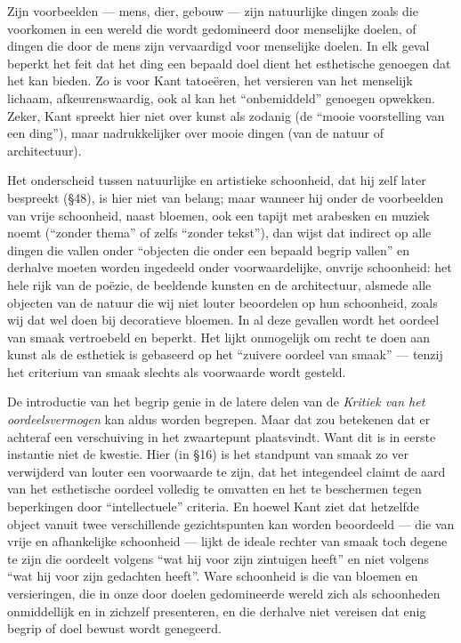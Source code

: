 Zijn voorbeelden — mens, dier, gebouw — zijn natuurlijke dingen zoals die voorkomen in een wereld die wordt gedomineerd door menselijke doelen, of dingen die door de mens zijn vervaardigd voor menselijke doelen. In elk geval beperkt het feit dat het ding een bepaald doel dient het esthetische genoegen dat het kan bieden. Zo is voor Kant tatoeëren, het versieren van het menselijk lichaam, afkeurenswaardig, ook al kan het ``onbemiddeld'' genoegen opwekken. Zeker, Kant spreekt hier niet over kunst als zodanig (de ``mooie voorstelling van een ding''), maar nadrukkelijker over mooie dingen (van de natuur of architectuur).

Het onderscheid tussen natuurlijke en artistieke schoonheid, dat hij zelf later bespreekt (§48), is hier niet van belang; maar wanneer hij onder de voorbeelden van vrije schoonheid, naast bloemen, ook een tapijt met arabesken en muziek noemt (``zonder thema'' of zelfs ``zonder tekst''), dan wijst dat indirect op alle dingen die vallen onder ``objecten die onder een bepaald begrip vallen'' en derhalve moeten worden ingedeeld onder voorwaardelijke, onvrije schoonheid: het hele rijk van de poëzie, de beeldende kunsten en de architectuur, alsmede alle objecten van de natuur die wij niet louter beoordelen op hun schoonheid, zoals wij dat wel doen bij decoratieve bloemen. In al deze gevallen wordt het oordeel van smaak vertroebeld en beperkt. Het lijkt onmogelijk om recht te doen aan kunst als de esthetiek is gebaseerd op het ``zuivere oordeel van smaak'' — tenzij het criterium van smaak slechts als voorwaarde wordt gesteld.

De introductie van het begrip genie in de latere delen van de \textit{Kritiek van het oordeelsvermogen} kan aldus worden begrepen. Maar dat zou betekenen dat er achteraf een verschuiving in het zwaartepunt plaatsvindt. Want dit is in eerste instantie niet de kwestie. Hier (in §16) is het standpunt van smaak zo ver verwijderd van louter een voorwaarde te zijn, dat het integendeel claimt de aard van het esthetische oordeel volledig te omvatten en het te beschermen tegen beperkingen door ``intellectuele'' criteria. En hoewel Kant ziet dat hetzelfde object vanuit twee verschillende gezichtspunten kan worden beoordeeld — die van vrije en afhankelijke schoonheid — lijkt de ideale rechter van smaak toch degene te zijn die oordeelt volgens ``wat hij voor zijn zintuigen heeft'' en niet volgens ``wat hij voor zijn gedachten heeft''. Ware schoonheid is die van bloemen en versieringen, die in onze door doelen gedomineerde wereld zich als schoonheden onmiddellijk en in zichzelf presenteren, en die derhalve niet vereisen dat enig begrip of doel bewust wordt genegeerd.

